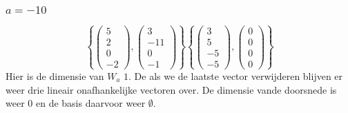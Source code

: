 \documentclass[lineaire_algebra_oplossingen.tex]{subfiles}
\begin{document}
\subsubsection*{$a=-10$}
\[
\left\lbrace
\begin{pmatrix}
5\\2\\0\\-2
\end{pmatrix}
,
\begin{pmatrix}
3\\-11\\0\\-1
\end{pmatrix}
\right\rbrace
\left\lbrace
\begin{pmatrix}
3\\5\\-5\\-5
\end{pmatrix}
,
\begin{pmatrix}
0\\0\\0\\0
\end{pmatrix}
\right\rbrace
\]
Hier is de dimensie van $W_a$ $1$. De als we de laatste vector verwijderen blijven er weer drie lineair onafhankelijke vectoren over. De dimensie vande doorsnede is weer $0$ en de basis daarvoor weer $\emptyset$.
\end{document}

